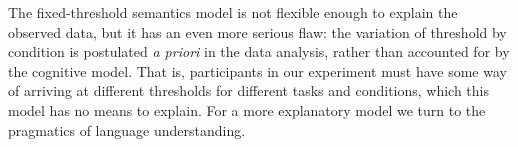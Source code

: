 \documentclass[10pt,letterpaper]{article}
\begin{document}
The fixed-threshold semantics model is not flexible enough to explain the observed data, but it has an even more serious flaw: the variation of threshold by condition is postulated \emph{a priori} in the data analysis, rather than accounted for by the cognitive model. That is, participants in our experiment must have some way of arriving at different thresholds for different tasks and conditions, which this model has no means to explain. For a more explanatory model we turn to the pragmatics of language understanding.


\end{document}
